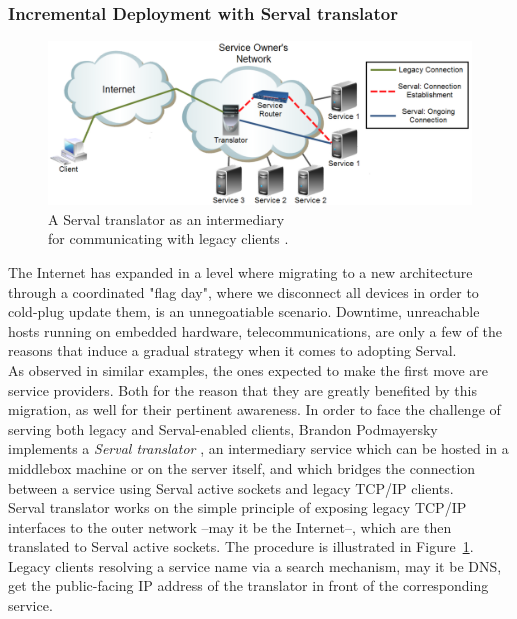 \subsubsection{Incremental Deployment with Serval translator}
\begin{figure}
\centering
\captionsetup{justification=centering}
\includegraphics[scale=0.25]{figures/Serval_translator}
\caption[Serval translator]{A Serval translator as an intermediary\\for communicating with legacy clients \cite{Podmayersky2011}.}
\label{fig:serval_translator}
\end{figure}
The Internet has expanded in a level where migrating to a new architecture through a coordinated "flag day", where we disconnect all devices in order to cold-plug update them, is an unnegoatiable scenario.
Downtime, unreachable hosts running on embedded hardware, telecommunications, are only a few of the reasons that induce a gradual strategy when it comes to adopting Serval.
\\ \indent As observed in similar examples, the ones expected to make the first move are service providers.
Both for the reason that they are greatly benefited by this migration, as well for their pertinent awareness.
In order to face the challenge of serving both legacy and Serval-enabled clients, Brandon Podmayersky implements a \emph{Serval translator} \cite{Podmayersky2011}, an intermediary service which can be hosted in a middlebox machine or on the server itself, and which bridges the connection between a service using Serval active sockets and legacy TCP/IP clients.
\\ \indent Serval translator works on the simple principle of exposing legacy TCP/IP interfaces to the outer network --may it be the Internet--, which are then translated to Serval active sockets.
The procedure is illustrated in Figure~\ref{fig:serval_translator}.
Legacy clients resolving a service name via a search mechanism, may it be DNS, get the public-facing IP address of the translator in front of the corresponding service.
